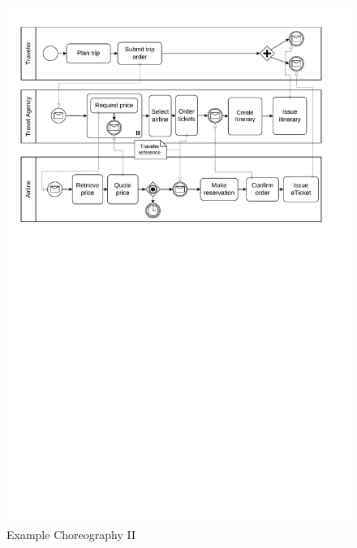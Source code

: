 \begin{landscape}
  \begin{figure}
    \centering
    \includegraphics[width=\textwidth]{figures/choreography.pdf}
    \caption{Example Choreography II}
    \label{fig:AnhangsChor2}
  \end{figure}
\end{landscape}


